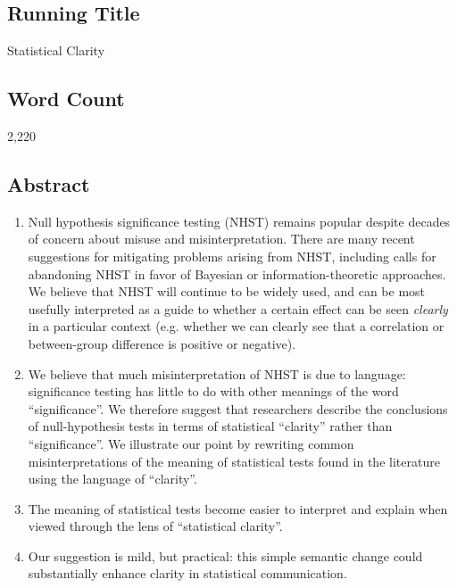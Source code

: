 
\flushbottom
\maketitle


\linenumbers

\subsection*{Running Title}

Statistical Clarity

\subsection*{Word Count}

2,220

\subsection*{Abstract}

\begin{enumerate}

\item Null hypothesis significance testing (NHST) remains popular despite decades of concern about misuse and misinterpretation. There are many recent suggestions for mitigating problems arising from NHST, including calls for abandoning NHST in favor of Bayesian or information-theoretic approaches. We believe that NHST will continue to be widely used, and can be most usefully interpreted as a guide to whether a certain effect can be seen \emph{clearly} in a particular context (e.g. whether we can clearly see that a correlation or between-group difference is positive or negative). 
\item We believe that much misinterpretation of NHST is due to language: significance testing has little to do with other meanings of the word ``significance''. We therefore suggest that researchers describe the conclusions of null-hypothesis tests in terms of statistical ``clarity'' rather than ``significance''. We illustrate our point by rewriting common misinterpretations of the meaning of statistical tests found in the literature using the language of ``clarity''.
\item The meaning of statistical tests become easier to interpret and explain when viewed through the lens of ``statistical clarity''.
\item Our suggestion is mild, but practical: this simple semantic change could substantially enhance clarity in statistical communication.

\end{enumerate}

